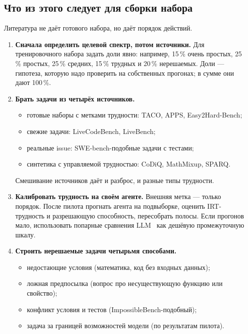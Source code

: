 \documentclass[11pt,a4paper]{article}
\begin{document}
\subsection{Что из этого следует для сборки набора}

Литература не даёт готового набора, но даёт порядок действий.

\begin{enumerate}
  \item \textbf{Сначала определить целевой спектр, потом источники.} Для
        тренировочного набора задать доли явно: например, 15\,\% очень
        простых, 25\,\% простых, 25\,\% средних, 15\,\% трудных и
        20\,\% нерешаемых. Доли — гипотеза, которую надо проверить на
        собственных прогонах; в сумме они дают 100\,\%.
  \item \textbf{Брать задачи из четырёх источников.}
        \begin{itemize}
          \item готовые наборы с метками трудности: TACO, APPS,
                Easy2Hard-Bench;
          \item свежие задачи: LiveCodeBench, LiveBench;
          \item реальные issue: SWE-bench-подобные задачи с тестами;
          \item синтетика с управляемой трудностью: CoDiQ, MathMixup,
                SPARQ.
        \end{itemize}
        Смешивание источников даёт и разброс, и разные типы трудности.
  \item \textbf{Калибровать трудность на своём агенте.} Внешняя метка —
        только порядок. После пилота прогнать агента на подвыборке,
        оценить IRT-трудность и разрешающую способность, пересобрать
        полосы. Если прогонов мало, использовать попарные сравнения
        LLM~\cite{llmcompare2025} как дешёвую промежуточную шкалу.
  \item \textbf{Строить нерешаемые задачи четырьмя способами.}
        \begin{itemize}
          \item недостающие условия (математика, код без входных данных);
          \item ложная предпосылка (вопрос про несуществующую функцию или
                свойство);
          \item конфликт условия и тестов (ImpossibleBench-подобный);
          \item задача за границей возможностей модели (по результатам
                пилота).

\end{itemize}
\end{enumerate}
\end{document}
